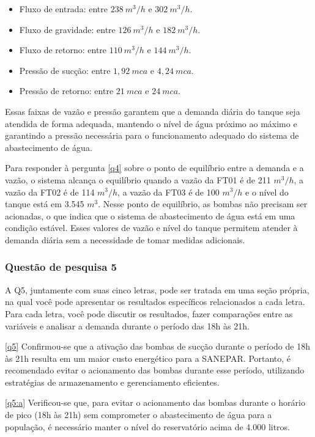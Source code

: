\begin{itemize}
	\item Fluxo de entrada: entre $238 \ m^3/h$ e $302 \ m^3/h$.
	\item Fluxo de gravidade: entre $126 \ m^3/h$ e $182 \ m^3/h$.
	\item Fluxo de retorno: entre $110 \ m^3/h$ e $144 \ m^3/h$.
	\item Pressão de sucção: entre $1,92 \ mca$ e $4,24 \ mca$.
	\item Pressão de retorno: entre $21 \ mca$ e $24 \ mca$.
\end{itemize}

Essas faixas de vazão e pressão garantem que a demanda diária do tanque seja atendida de forma adequada, mantendo o nível de água próximo ao máximo e garantindo a pressão necessária para o funcionamento adequado do sistema de abastecimento de água.


Para responder à pergunta \ref{q4} sobre o ponto de equilíbrio entre a demanda e a vazão, o sistema alcança o equilíbrio quando a vazão da FT01 é de 211 $m^3/h$, a vazão da FT02 é de 114 $m^3/h$, a vazão da FT03 é de 100 $m^3/h$ e o nível do tanque está em 3.545 $m^3$. Nesse ponto de equilíbrio, as bombas não precisam ser acionadas, o que indica que o sistema de abastecimento de água está em uma condição estável. Esses valores de vazão e nível do tanque permitem atender à demanda diária sem a necessidade de tomar medidas adicionais.


\subsubsection{Quest\~ao de pesquisa 5}

A Q5, juntamente com suas cinco letras, pode ser tratada em uma seção própria, na qual você pode apresentar os resultados específicos relacionados a cada letra. Para cada letra, você pode discutir os resultados, fazer comparações entre as variáveis e analisar a demanda durante o período das 18h às 21h.

\ref{q5} Confirmou-se que a ativação das bombas de sucção durante o período de 18h às 21h resulta em um maior custo energético para a SANEPAR. Portanto, é recomendado evitar o acionamento das bombas durante esse período, utilizando estratégias de armazenamento e gerenciamento eficientes.

\ref{q5:a} Verificou-se que, para evitar o acionamento das bombas durante o horário de pico (18h às 21h) sem comprometer o abastecimento de água para a população, é necessário manter o nível do reservatório acima de 4.000 litros.

